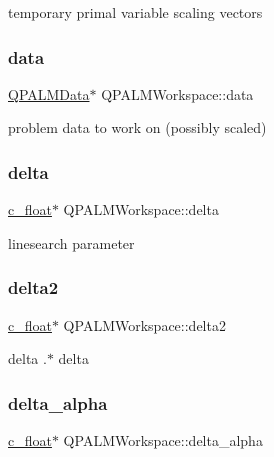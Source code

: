 temporary primal variable scaling vectors 

\mbox{\label{structQPALMWorkspace_aef5a70ffeeade2377480c7cae36a8964}} 
\subsubsection{\texorpdfstring{data}{data}}
{\footnotesize\ttfamily \mbox{\hyperlink{structQPALMData}{Q\+P\+A\+L\+M\+Data}}$\ast$ Q\+P\+A\+L\+M\+Workspace\+::data}



problem data to work on (possibly scaled) 

\mbox{\label{structQPALMWorkspace_a21bf2ea2cefa8eea9b7c4575d4dbca51}} 
\subsubsection{\texorpdfstring{delta}{delta}}
{\footnotesize\ttfamily \mbox{\hyperlink{global__opts_8h_a7f1a9fda95e52979658c20a0d134fb15}{c\+\_\+float}}$\ast$ Q\+P\+A\+L\+M\+Workspace\+::delta}



linesearch parameter 

\mbox{\label{structQPALMWorkspace_a2bd4914a52d02e2b11c56863976bb5ff}} 
\subsubsection{\texorpdfstring{delta2}{delta2}}
{\footnotesize\ttfamily \mbox{\hyperlink{global__opts_8h_a7f1a9fda95e52979658c20a0d134fb15}{c\+\_\+float}}$\ast$ Q\+P\+A\+L\+M\+Workspace\+::delta2}



delta .$\ast$ delta 

\mbox{\label{structQPALMWorkspace_a68f6c37d8ac59bda4e2fad32e3935d99}} 
\subsubsection{\texorpdfstring{delta\_alpha}{delta\_alpha}}
{\footnotesize\ttfamily \mbox{\hyperlink{global__opts_8h_a7f1a9fda95e52979658c20a0d134fb15}{c\+\_\+float}}$\ast$ Q\+P\+A\+L\+M\+Workspace\+::delta\+\_\+alpha}



